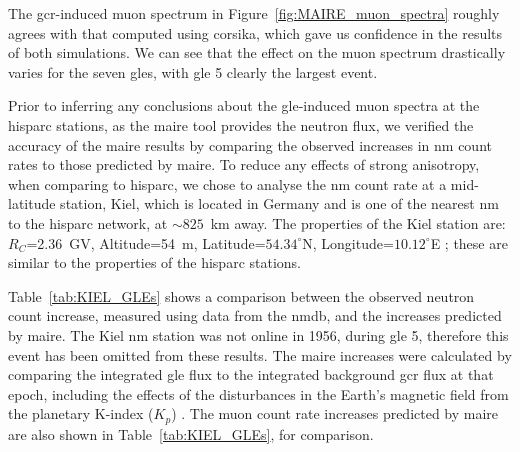 The \gls{gcr}-induced muon spectrum in Figure~\ref{fig:MAIRE_muon_spectra} roughly agrees with that computed using \gls{corsika}, which gave us confidence in the results of both simulations. We can see that the effect on the muon spectrum drastically varies for the seven \glspl{gle}, with \gls{gle} 5 clearly the largest event.

Prior to inferring any conclusions about the \gls{gle}-induced muon spectra at the \gls{hisparc} stations, as the \gls{maire} tool provides the neutron flux, we verified the accuracy of the \gls{maire} results by comparing the observed increases in \gls{nm} count rates to those predicted by \gls{maire}. To reduce any effects of strong anisotropy, when comparing to \gls{hisparc}, we chose to analyse the \gls{nm} count rate at a mid-latitude station, Kiel, which is located in Germany and is one of the nearest \gls{nm} to the \gls{hisparc} network, at $\sim 825$~km away. The properties of the Kiel station are: $R_C$=2.36~GV, Altitude=54~m, Latitude=$54.34^{\circ}$N, Longitude=$10.12^{\circ}$E \citep{nmdb_nmdb_nodate}; these are similar to the properties of the \gls{hisparc} stations.

Table~\ref{tab:KIEL_GLEs} shows a comparison between the observed neutron count increase, measured using data from the \gls{nmdb}, and the increases predicted by \gls{maire}. The Kiel \gls{nm} station was not online in 1956, during \gls{gle} 5, therefore this event has been omitted from these results. The \gls{maire} increases were calculated by comparing the integrated \gls{gle} flux to the integrated background \gls{gcr} flux at that epoch, including the effects of the disturbances in the Earth's magnetic field from the planetary K-index ($K_p$) \citep{bartels_three-hour-range_1939}. The muon count rate increases predicted by \gls{maire} are also shown in Table~\ref{tab:KIEL_GLEs}, for comparison.

\vspace{1em}

